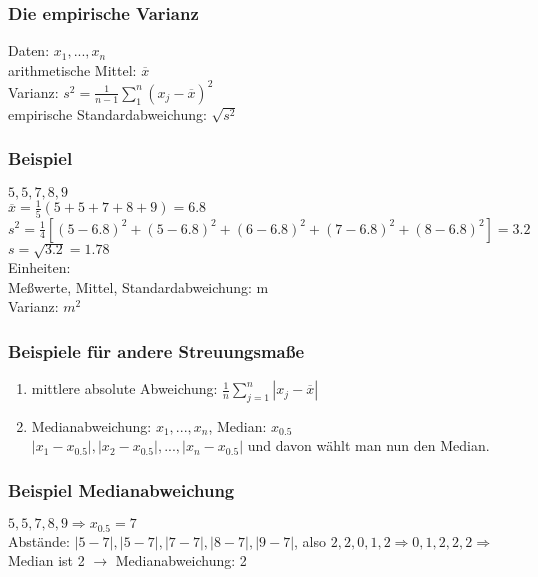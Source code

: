 \subsubsection{Die empirische Varianz}
Daten: $ x_1, ..., x_n $\\
arithmetische Mittel: $ \overline{x} $\\
Varianz: $ s^2 = \frac{1}{n-1} \sum_1^n (x_j - \overline{x})^2$\\
empirische Standardabweichung: $ \sqrt{s^2} $

\subsubsection{Beispiel} $ 5,5,7,8,9 $\\
$ \overline{x} = \frac{1}{5} (5+5+7+8+9) = 6.8 $\\
$ s^2 = \frac{1}{4} [(5-6.8)^2 + (5-6.8)^2 + (6-6.8)^2 + (7-6.8)^2 + (8-6.8)^2 ] = 3.2 $\\
$ s=\sqrt{3.2} = 1.78$\\
Einheiten:\\
Meßwerte, Mittel, Standardabweichung: m\\
Varianz: $ m^2 $

\subsubsection{Beispiele für andere Streuungsmaße}
\begin{enumerate}
\item mittlere absolute Abweichung: $ \frac{1}{n} \sum_{j=1}^{n} |x_j - \overline{x}| $
\item Medianabweichung: $ x_1, ..., x_n $, Median: $ x_{0.5} $\\
	$ |x_1 - x_{0.5}|, |x_2 - x_{0.5}|, ..., |x_n - x_{0.5}| $ und davon wählt man nun den Median.
\end{enumerate}

\subsubsection{Beispiel Medianabweichung}
$ 5,5,7,8,9 \Rightarrow x_{0.5} = 7 $\\
Abstände: $ |5-7|, |5-7|, |7-7|, |8-7|, |9-7| $, also $ 2,2,0,1,2 \Rightarrow 0,1,2,2,2 \Rightarrow $ Median ist 2 $ \rightarrow $ Medianabweichung: 2 

